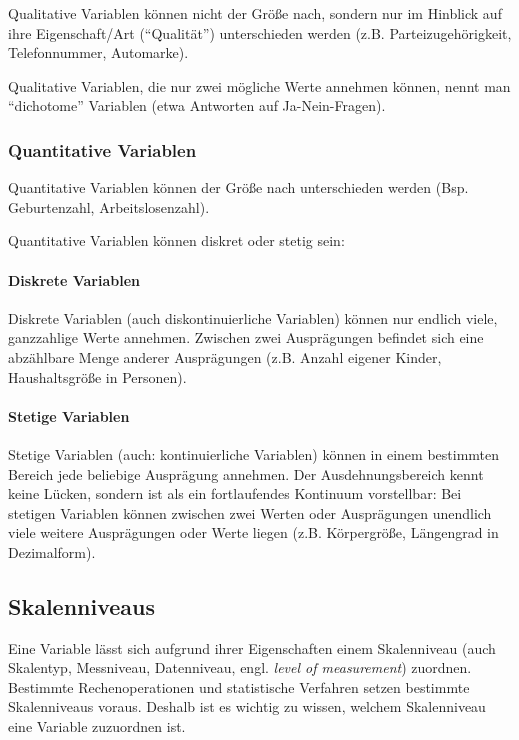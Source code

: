 \documentclass[
  11pt,
  ngerman,
  a4paper,
]{report}
\begin{document}
Qualitative Variablen können nicht der Größe nach, sondern nur im Hinblick auf ihre Eigenschaft/Art (\enquote{Qualität}) unterschieden werden (z.B. Parteizugehörigkeit, Telefonnummer, Automarke).

Qualitative Variablen, die nur zwei mögliche Werte annehmen können, nennt man \enquote{dichotome} Variablen (etwa Antworten auf Ja-Nein-Fragen).

\hypertarget{quantitative-variablen}{%
\subsubsection{Quantitative Variablen}\label{quantitative-variablen}}

Quantitative Variablen können der Größe nach unterschieden werden (Bsp. Geburtenzahl, Arbeitslosenzahl).

Quantitative Variablen können diskret oder stetig sein:

\hypertarget{diskrete-variablen}{%
\paragraph{Diskrete Variablen}\label{diskrete-variablen}}

Diskrete Variablen (auch diskontinuierliche Variablen) können nur endlich viele, ganzzahlige Werte annehmen. Zwischen zwei Ausprägungen befindet sich eine abzählbare Menge anderer Ausprägungen (z.B. Anzahl eigener Kinder, Haushaltsgröße in Personen).

\hypertarget{stetige-variablen}{%
\paragraph{Stetige Variablen}\label{stetige-variablen}}

Stetige Variablen (auch: kontinuierliche Variablen) können in einem bestimmten Bereich jede beliebige Ausprägung annehmen. Der Ausdehnungsbereich kennt keine Lücken, sondern ist als ein fortlaufendes Kontinuum vorstellbar: Bei stetigen Variablen können zwischen zwei Werten oder Ausprägungen unendlich viele weitere Ausprägungen oder Werte liegen (z.B. Körpergröße, Längengrad in Dezimalform).

\hypertarget{skalenniveaus}{%
\subsection{Skalenniveaus}\label{skalenniveaus}}

Eine Variable lässt sich aufgrund ihrer Eigenschaften einem Skalenniveau (auch Skalentyp, Messniveau, Datenniveau, engl. \emph{level of measurement}) zuordnen. Bestimmte Rechenoperationen und statistische Verfahren setzen bestimmte Skalenniveaus voraus. Deshalb ist es wichtig zu wissen, welchem Skalenniveau eine Variable zuzuordnen ist.
\end{document}

